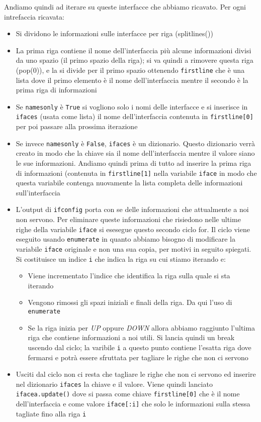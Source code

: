 \documentclass[11pt]{article}
\begin{document}
Andiamo quindi ad iterare su queste interfacce che abbiamo ricavato.
Per ogni intrefaccia ricavata:
\begin{itemize}
	\item{Si dividono le informazioni sulle interfacce per riga (splitlines())}
	\item{La prima riga contiene il nome dell'interfaccia più alcune informazioni divisi da uno spazio (il primo spazio della riga);
		si va quindi a rimovere questa riga (pop(0)), e la si divide per il primo spazio ottenendo \texttt{firstline}
		che è una lista dove il primo elemento è il nome dell'interfaccia mentre il secondo è la prima riga
		di informazioni}
	\item{Se \texttt{namesonly} è \texttt{True} si vogliono solo i nomi delle interfacce e si inserisce in \texttt{ifaces}
		(usata come lista) il nome dell'interfaccia contenuta in \texttt{firstline[0]} per poi passare alla prossima iterazione}
	\item{Se invece \texttt{namesonly} è \texttt{False}, \texttt{ifaces} è un dizionario. Questo dizionario verrà creato in modo
		che la chiave sia il nome dell'interfaccia mentre il valore siano le sue informazioni.
		Andiamo quindi prima di tutto ad inserire la prima riga di informazioni (contenuta in \texttt{firstline[1]}
		nella variabile \texttt{iface} in modo che questa variabile contenga  nuovamente la lista completa delle informazioni
		sull'interfaccia}
	\item{L'output di \texttt{ifconfig} porta con se delle informazioni che attualmente a noi non servono.
		Per eliminare queste informazioni che risiedono nelle ultime righe della variabile \texttt{iface} si esesegue questo secondo ciclo for.
		Il ciclo viene eseguito usando \texttt{enumerate} in quanto abbiamo bisogno di modificare la variabile \texttt{iface} originale
		e non una sua copia, per motivi in seguito spiegati.\\
		Si costituisce un indice \texttt{i} che indica la riga su cui stiamo iterando e:
		\begin{itemize}
			\item{Viene incrementato l'indice che identifica la riga sulla quale si sta iterando}
			\item{Vengono rimossi gli spazi iniziali e finali della riga. Da qui l'uso di \texttt{enumerate}}
			\item{Se la riga inizia per \textit{UP} oppure \textit{DOWN} allora abbiamo raggiunto l'ultima riga che contiene informazioni
				a noi utili. Si lancia quindi un break uscendo dal ciclo; la varibile \texttt{i} a questo punto
				contiene l'esatta riga dove fermarsi  e potrà essere sfruttata per tagliare le righe che non ci servono}
		\end{itemize}}
	\item{Usciti dal ciclo non ci resta che tagliare le righe che non ci servono ed inserire nel dizionario \texttt{ifaces}
		la chiave e il valore. Viene quindi lanciato \texttt{ifacea.update()} dove si passa come chiave \texttt{firstline[0]} che è il nome
		dell'interfaccia e come valore \texttt{iface[:i]} che solo le informazioni sulla stessa tagliate fino alla riga \texttt{i}}
\end{itemize}
\end{document}
